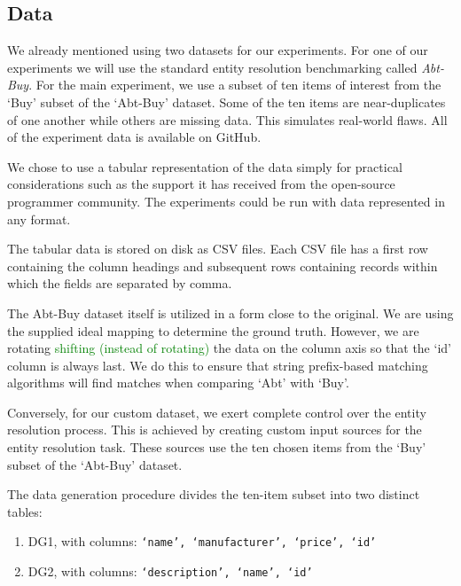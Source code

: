 \documentclass[lettersize,journal]{IEEEtran}
\begin{document}
    \subsection{Data}

    We already mentioned using two datasets for our experiments.
    For one of our experiments we will use the standard entity resolution
    benchmarking called \textit{Abt-Buy}\cite{vldb2010}.
    For the main experiment, we use a subset of ten items of interest from the
    `Buy' subset of the `Abt-Buy' dataset.
    Some of the ten items are near-duplicates of one another while others are
    missing data.
    This simulates real-world flaws.
    All of the experiment data is available on GitHub\cite{expdata2023}.
    
    We chose to use a tabular representation of the data simply for practical
    considerations such as the support it has received from the open-source
    programmer community\cite{pandas2010,pandas2023}.
    The experiments could be run with data represented in any format.
    
    The tabular data is stored on disk as CSV files.
    Each CSV file has a first row containing the column headings and subsequent
    rows containing records within which the fields are separated by comma.

    The Abt-Buy dataset itself is utilized in a form close to the original.
    We are using the supplied ideal mapping to determine the ground truth.
    However, we are rotating 
    \textcolor{green}{shifting (instead of rotating)} 
    the data on the column axis so that the `id' column
    is always last.
    We do this to ensure that string prefix-based matching algorithms will find
    matches when comparing `Abt' with `Buy'.

    Conversely, for our custom dataset, we exert complete control over the
    entity resolution process.
    This is achieved by creating custom input sources for the entity resolution
    task.
    These sources use the ten chosen items from the `Buy' subset of the
    `Abt-Buy' dataset.

    The data generation procedure divides the ten-item subset into two distinct
    tables:

    \begin{enumerate}[label=\textbullet,leftmargin=1cm]
    \item DG1, with columns: \texttt{`name', `manufacturer', `price', `id'}
    \item DG2, with columns: \texttt{`description', `name', `id'}
    \end{enumerate}
\end{document}
